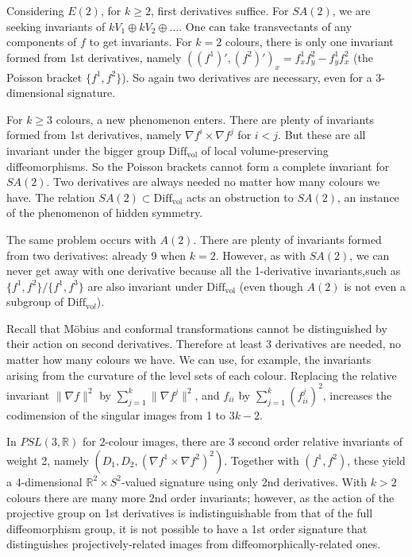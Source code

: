 \documentclass[review,onefignum,onetabnum]{siamonline190516}
\begin{document}
Considering $E(2)$, for $k\ge 2$, first derivatives suffice. 
For $SA(2)$,  we are seeking invariants of $k V_1 \oplus k V_2 \oplus \dots$. One can take transvectants of any components of $f$ to get invariants. For $k=2$ colours, there is only one  invariant formed from 1st derivatives, namely $((f^1)',(f^2)')_x = f^1_x f^2_y - f^1_y f^2_x$ (the Poisson bracket $\{f^1,f^2\}$). So again two derivatives are necessary, even for a 3-dimensional signature.

For $k\ge 3$ colours, a new phenomenon enters.  There are plenty of invariants formed from 1st derivatives, namely $\nabla f^i \times \nabla f^j$ for $i<j$. But these are all invariant under the bigger group $\mathrm{Diff}_{\mathrm{vol}}$ of local volume-preserving diffeomorphisms. So the Poisson brackets cannot form a complete invariant for $SA(2)$. Two derivatives are always needed no matter how many colours we have. The relation $SA(2)\subset \mathrm{Diff}_{\mathrm{vol}}$ acts an obstruction to $SA(2)$, an instance of the phenomenon of hidden symmetry.

The same problem occurs with $A(2)$. There are plenty of invariants formed from two derivatives: already 9 when $k=2$. However, as with $SA(2)$, we can never get away with one derivative because all the 1-derivative invariants,such as $\{f^1,f^2\}/\{f^1,f^3\}$ are also invariant under $\mathrm{Diff}_{\mathrm{vol}}$ (even though $A(2)$ is not even a subgroup of $\mathrm{Diff}_{\mathrm{vo}l}$).

Recall that M\"obius and conformal transformations cannot be distinguished by their action on second derivatives. Therefore at least 3 derivatives are needed, no matter how many colours we have. We can use, for example, the invariants arising from the curvature of the level sets of each colour. Replacing the relative invariant $\|\nabla f\|^2$ by $\sum_{j=1}^k \|\nabla f^j\|^2$, and $f_{ii}$ by $\sum_{j=1}^k (f^j_{ii})^2$, increases the codimension of the singular images from 1 to $3k-2$.

In $PSL(3, \mathbb{R})$ for $2$-colour images, there are 3 second order relative invariants of weight 2, namely $(D_1,D_2,(\nabla f^1\times \nabla f^2)^2)$. Together with $(f^1,f^2)$, these yield a 4-dimensional $\mathbb{R}^2\times S^2$-valued signature using only 2nd derivatives. With $k>2$ colours there are many more 2nd order invariants; however, as the action of the projective group on 1st derivatives is indistinguishable from that of the full diffeomorphism group, it is not possible to have a 1st order signature that distinguishes projectively-related images from diffeomorphically-related ones.
\end{document}
